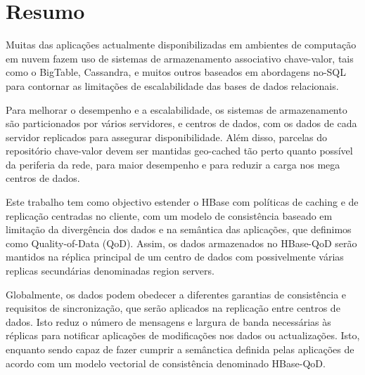 \newpage
\chapter*{Resumo}
\thispagestyle{empty}

Muitas das aplicações actualmente disponibilizadas em ambientes de computação em nuvem fazem uso de sistemas de armazenamento associativo chave-valor, tais como o BigTable, Cassandra, e muitos outros baseados em abordagens no-SQL para contornar as limitações de escalabilidade das bases de dados relacionais.


Para melhorar o desempenho e a escalabilidade, os sistemas de armazenamento são particionados por vários servidores, e centros de dados, com os dados de cada servidor replicados para assegurar disponibilidade. Além disso, parcelas do repositório chave-valor devem ser mantidas geo-cached tão perto quanto possível da periferia da rede, para maior desempenho e para reduzir a carga nos mega centros de dados.

Este trabalho tem como objectivo estender o HBase com políticas de caching e de replicação centradas no cliente, com um modelo de consistência baseado em limitação da divergência dos dados e na semântica das aplicações, que definimos como Quality-of-Data (QoD). Assim, os dados armazenados no HBase-QoD serão mantidos na réplica principal de um centro de dados com possivelmente várias replicas  secundárias denominadas region servers.

Globalmente, os dados podem obedecer a diferentes garantias de consistência e requisitos de sincronização, que serão aplicados na replicação entre centros de dados. Isto reduz o número de mensagens e largura de banda necessárias às réplicas para notificar aplicações de modificações nos dados ou actualizações. Isto, enquanto sendo capaz de fazer cumprir a semânctica definida pelas aplicações de acordo com um modelo vectorial de consistência denominado HBase-QoD.

\newpage

\chapter*{}
\thispagestyle{empty}

